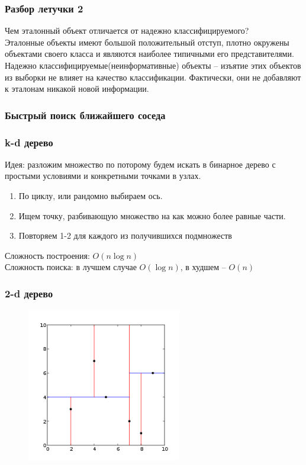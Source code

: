 \documentclass[12pt]{beamer}
\begin{document}
\begin{frame}\frametitle{Разбор летучки 2}
Чем эталонный объект отличается от надежно классифицируемого?\\
\vspace{8mm}
Эталонные объекты имеют большой положительный отступ, плотно окружены
объектами своего класса и являются наиболее типичными его представителями.\\
\vspace{5mm}
Надежно классифицируемые(неинформативные) объекты -- изъятие
этих объектов из выборки не влияет на качество классификации. Фактически, они не добавляют к эталонам никакой новой информации. 

\end{frame}

\begin{frame}\frametitle{Быстрый поиск ближайшего соседа}
\end{frame}

\begin{frame}\frametitle{k-d дерево}
Идея: разложим множество по поторому будем искать
в бинарное дерево с простыми условиями и
конкретными точками в узлах.
\vspace{5mm}
\begin{enumerate}
\item По циклу, или рандомно выбираем ось.
\item Ищем точку, разбивающую множество на как
можно более равные части.
\item Повторяем 1-2 для каждого из получившихся подмножеств 
\end{enumerate}
Сложность построения: $O(n\log n)$\\
Сложность поиска: в лучшем
случае $O(\log n)$, в худшем -- $O(n)$
\end{frame}
\begin{frame}\frametitle{2-d дерево}

\begin{figure}[htbp]
\centering
\includegraphics[height=190pt]{images/Kdtree_2d}  
\end{figure}
\end{frame}
\end{document}
